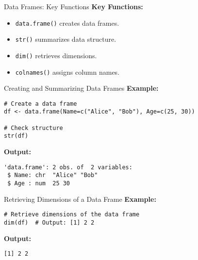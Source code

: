 \documentclass{beamer}
\begin{document}
\begin{frame}[fragile]{Data Frames: Key Functions}
\textbf{Key Functions:}
\begin{itemize}
    \item \texttt{data.frame()} creates data frames.
    \item \texttt{str()} summarizes data structure.
    \item \texttt{dim()} retrieves dimensions.
    \item \texttt{colnames()} assigns column names.
\end{itemize}
\end{frame}

\begin{frame}[fragile]{Creating and Summarizing Data Frames}
\textbf{Example:}
\begin{verbatim}
# Create a data frame
df <- data.frame(Name=c("Alice", "Bob"), Age=c(25, 30))

# Check structure
str(df)
\end{verbatim}
\textbf{Output:}
\begin{verbatim}
'data.frame': 2 obs. of  2 variables:
 $ Name: chr  "Alice" "Bob"
 $ Age : num  25 30
\end{verbatim}
\end{frame}

\begin{frame}[fragile]{Retrieving Dimensions of a Data Frame}
\textbf{Example:}
\begin{verbatim}
# Retrieve dimensions of the data frame
dim(df)  # Output: [1] 2 2
\end{verbatim}
\textbf{Output:}
\begin{verbatim}
[1] 2 2
\end{verbatim}
\end{frame}
\end{document}
